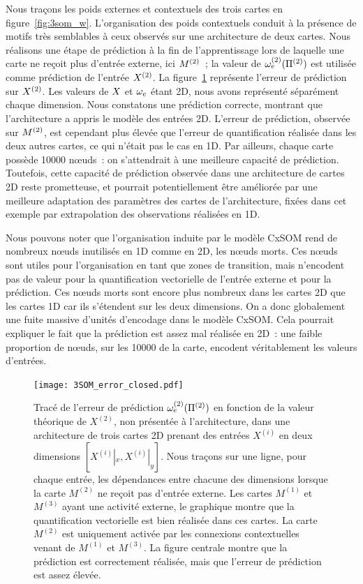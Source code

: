 \documentclass[../main]{subfiles}
\begin{document}
Nous traçons les poids externes et contextuels des trois cartes en figure~\ref{fig:3som_w}.
L'organisation des poids contextuels conduit à la présence de motifs très semblables à ceux observés sur une architecture de deux cartes.
Nous réalisons une étape de prédiction à la fin de l'apprentissage lors de laquelle une carte ne reçoit plus d'entrée externe, ici $M^{({2})}$~; la valeur de $\omega_{e}^{({2})}(\Pi^{({2})})$ est utilisée comme prédiction de l'entrée $X^{({2})}$.
La figure~\ref{fig:3som_pred} représente l'erreur de prédiction sur $X^{({2})}$.
Les valeurs de $X$ et $\omega_e$ étant 2D, nous avons représenté séparément chaque dimension. 
Nous constatons une prédiction correcte, montrant que l'architecture a appris le modèle des entrées 2D.
L'erreur de prédiction, observée sur $M^{({2})}$, est cependant plus élevée que l'erreur de quantification réalisée dans les deux autres cartes, ce qui n'était pas le cas en 1D.
Par ailleurs, chaque carte possède 10000 n\oe{}uds~: on s'attendrait à une meilleure capacité de prédiction. Toutefois, cette capacité de prédiction observée dans une architecture de cartes 2D reste prometteuse, et pourrait potentiellement être améliorée par une meilleure adaptation des paramètres des cartes de l'architecture, fixées dans cet exemple par extrapolation des observations réalisées en 1D.

Nous pouvons noter que l'organisation induite par le modèle CxSOM rend de nombreux n\oe{}uds inutilisés en 1D comme en 2D, les n\oe{}uds morts. Ces n\oe{}uds sont utiles pour l'organisation en tant que zones de transition, mais n'encodent pas de valeur pour la quantification vectorielle de l'entrée externe et pour la prédiction. Ces n\oe{}uds morts sont encore plus nombreux dans les cartes 2D que les cartes 1D car ils s'étendent sur les deux dimensions. On a donc globalement une fuite massive d'unités d'encodage dans le modèle CxSOM. 
Cela pourrait expliquer le fait que la prédiction est assez mal réalisée en 2D~: une faible proportion de n\oe{}uds, sur les 10000 de la carte, encodent véritablement les valeurs d'entrées.


\begin{figure}
\centering\texttt{[image: 3SOM\_error\_closed.pdf]}
\caption{Tracé de l'erreur de prédiction $\omega_e^{({2})}(\Pi^{({2})})$ en fonction de la valeur théorique de $X^{(2)}$, non présentée à l'architecture, dans une architecture de trois cartes 2D prenant des entrées $X^{(i)}$ en deux dimensions $[X^{(i)}|_x, X^{(i)}|_y]$. Nous traçons sur une ligne, pour chaque entrée, les dépendances entre chacune des dimensions
lorsque la carte $M^{(2)}$ ne reçoit pas d'entrée externe. Les cartes $M^{(1)}$ et $M^{(3)}$ ayant une activité externe, le graphique montre que la quantification vectorielle est bien réalisée dans ces cartes. La carte $M^{(2)}$ est uniquement activée par les connexions contextuelles venant de $M^{(1)}$ et $M^{(3)}$. La figure centrale montre que la prédiction est correctement réalisée, mais que l'erreur de prédiction est assez élevée. \label{fig:3som_pred}}
\end{figure}
\end{document}
